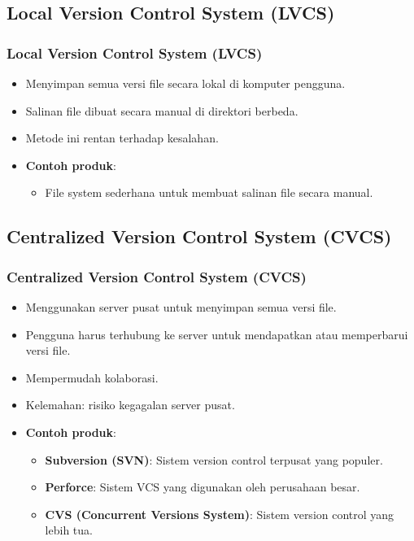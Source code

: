 \documentclass[aspectratio=169, table]{beamer}
\begin{document}
	\subsection{Local Version Control System (LVCS)}
	
	\begin{frame}[fragile]
		\frametitle{Local Version Control System (LVCS)}
		\begin{itemize}
			\item Menyimpan semua versi file secara lokal di komputer pengguna.
			\item Salinan file dibuat secara manual di direktori berbeda.
			\item Metode ini rentan terhadap kesalahan.
			\item \textbf{Contoh produk}:
			\begin{itemize}
				\item File system sederhana untuk membuat salinan file secara manual.
			\end{itemize}
		\end{itemize}
	\end{frame}
	
	\subsection{Centralized Version Control System (CVCS)}
	
	\begin{frame}[fragile]
		\frametitle{Centralized Version Control System (CVCS)}
		\begin{itemize}
			\item Menggunakan server pusat untuk menyimpan semua versi file.
			\item Pengguna harus terhubung ke server untuk mendapatkan atau memperbarui versi file.
			\item Mempermudah kolaborasi.
			\item Kelemahan: risiko kegagalan server pusat.
			\item \textbf{Contoh produk}:
			\begin{itemize}
				\item \textbf{Subversion (SVN)}: Sistem version control terpusat yang populer.
				\item \textbf{Perforce}: Sistem VCS yang digunakan oleh perusahaan besar.
				\item \textbf{CVS (Concurrent Versions System)}: Sistem version control yang lebih tua.
			\end{itemize}
		\end{itemize}
	\end{frame}
	
\end{document}
